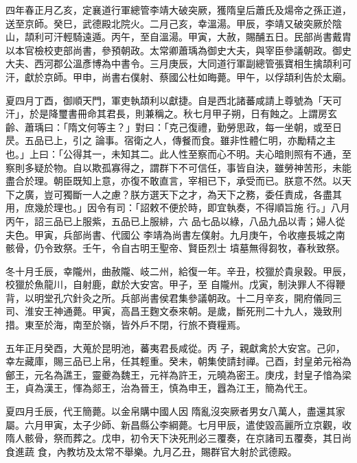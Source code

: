 
\begin{pinyinscope}

 四年春正月乙亥，定襄道行軍總管李靖大破突厥，獲隋皇后蕭氏及煬帝之孫正道，送至京師。癸巳，武德殿北院火。二月己亥，幸溫湯。甲辰，李靖又破突厥於陰山，頡利可汗輕騎遠遁。丙午，至自溫湯。甲寅，大赦，賜酺五日。民部尚書戴胄
 以本官檢校吏部尚書，參預朝政。太常卿蕭瑀為御史大夫，與宰臣參議朝政。御史大夫、西河郡公溫彥博為中書令。三月庚辰，大同道行軍副總管張寶相生擒頡利可汗，獻於京師。甲申，尚書右僕射、蔡國公杜如晦薨。甲午，以俘頡利告於太廟。



 夏四月丁酉，御順天門，軍吏執頡利以獻捷。自是西北諸蕃咸請上尊號為「天可汗」，於是降璽書冊命其君長，則兼稱之。秋七月甲子朔，日有蝕之。上謂房玄齡、蕭瑀曰：「隋文何等主？」對曰：「克己復禮，勤勞思政，每一坐朝，或至日昃。五品已上，引之
 論事。宿衛之人，傳餐而食。雖非性體仁明，亦勵精之主也。」上曰：「公得其一，未知其二。此人性至察而心不明。夫心暗則照有不通，至察則多疑於物。自以欺孤寡得之，謂群下不可信任，事皆自決，雖勞神苦形，未能盡合於理。朝臣既知上意，亦復不敢直言，宰相已下，承受而已。朕意不然。以天下之廣，豈可獨斷一人之慮？朕方選天下之才，為天下之務，委任責成，各盡其用，庶幾於理也。」因令有司：「詔敕不便於時，即宜執奏，不得順旨施
 行。」八月丙午，詔三品已上服紫，五品已上服緋，六
 品七品以綠，八品九品以青；婦人從夫色。甲寅，兵部尚書、代國公
 李靖為尚書左僕射。九月庚午，令收瘞長城之南骸骨，仍令致祭。壬午，令自古明王聖帝、賢臣烈士
 墳墓無得芻牧，春秋致祭。



 冬十月壬辰，幸隴州，曲赦隴、岐二州，給復一年。辛丑，校獵於貴泉穀。甲辰，校獵於魚龍川，自射鹿，獻於大安宮。甲子，至
 自隴州。戊寅，制決罪人不得鞭背，以明堂孔穴針灸之所。兵部尚書侯君集參議朝政。十二月辛亥，開府儀同三司、淮安王神通薨。甲寅，高昌王麴文泰來朝。是歲，斷死刑二十九人，幾致刑措。東至於海，南至於嶺，皆外戶不閉，行旅不賚糧焉。



 五年正月癸酉，大蒐於昆明池，蕃夷君長咸從。丙
 子，親獻禽於大安宮。己卯，幸左藏庫，賜三品已上帛，任其輕重。癸未，朝集使請封禪。己酉，封皇弟元裕為鄶王，元名為譙王，靈夔為魏王，元祥為許王，元曉為密王。庚戌，封皇子愔為梁王，貞為漢王，惲為郯王，治為晉王，慎為申王，囂為江王，簡為代王。



 夏四月壬辰，代王簡薨。以金帛購中國人因
 隋亂沒突厥者男女八萬人，盡還其家屬。六月甲寅，太子少師、新昌縣公李綱薨。七月甲辰，遣使毀高麗所立京觀，收隋人骸骨，祭而葬之。戊申，初令天下決死刑必三覆奏，在京諸司五覆奏，其日尚食進蔬
 食，內教坊及太常不舉樂。九月乙丑，賜群官大射於武德殿。




\end{pinyinscope}
